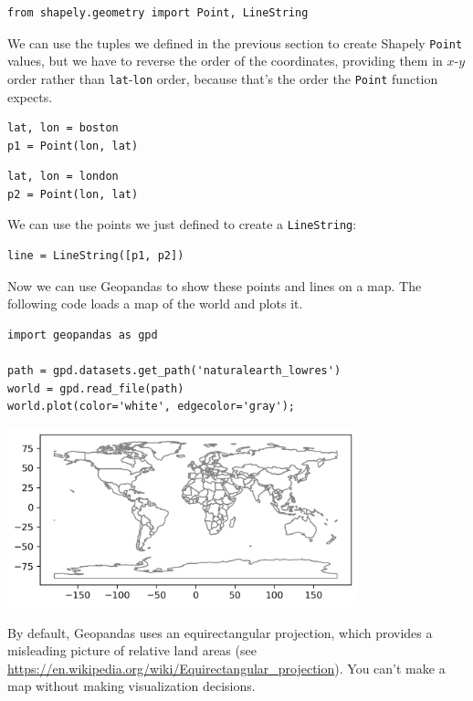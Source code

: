 \begin{lstlisting}[]
from shapely.geometry import Point, LineString
\end{lstlisting}

We can use the tuples we defined in the previous section to create
Shapely \passthrough{\lstinline!Point!} values, but we have to reverse
the order of the coordinates, providing them in \(x\)-\(y\) order rather
than \passthrough{\lstinline!lat!}-\passthrough{\lstinline!lon!} order,
because that's the order the \passthrough{\lstinline!Point!} function
expects.

\begin{lstlisting}[]
lat, lon = boston
p1 = Point(lon, lat)
\end{lstlisting}

\begin{lstlisting}[]
lat, lon = london
p2 = Point(lon, lat)
\end{lstlisting}

We can use the points we just defined to create a
\passthrough{\lstinline!LineString!}:

\begin{lstlisting}[]
line = LineString([p1, p2])
\end{lstlisting}

Now we can use Geopandas to show these points and lines on a map. The
following code loads a map of the world and plots it.

\begin{lstlisting}[]
import geopandas as gpd

path = gpd.datasets.get_path('naturalearth_lowres')
world = gpd.read_file(path)
world.plot(color='white', edgecolor='gray');
\end{lstlisting}

\begin{center}
\includegraphics[width=4in]{chapters/02_times_files/02_times_122_0.png}
\end{center}

By default, Geopandas uses an equirectangular projection, which provides
a misleading picture of relative land areas (see
\url{https://en.wikipedia.org/wiki/Equirectangular_projection}). You
can't make a map without making visualization decisions.

